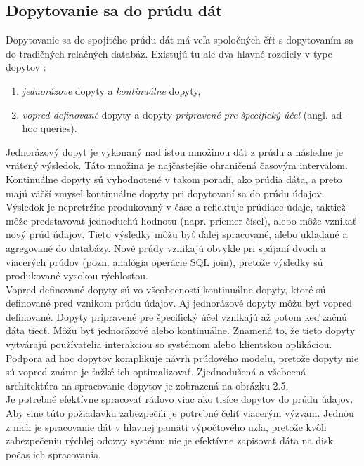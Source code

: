 \newpage
\subsection{Dopytovanie sa do prúdu dát}
Dopytovanie sa do spojitého prúdu dát má veľa spoločných čŕt s dopytovaním sa do tradičných relačných databáz. Existujú tu ale dva hlavné rozdiely v type dopytov \citep{terry1992continuous}: 
\begin{enumerate}
	\item \textit{jednorázove} dopyty a \textit{kontinuálne} dopyty,
	\item \textit{vopred definované} dopyty a dopyty \textit{pripravené pre špecifický účel} (angl. ad-hoc queries).
\end{enumerate}
Jednorázový dopyt je vykonaný nad istou množinou dát z prúdu a následne je vrátený výsledok. Táto množina je najčastejšie ohraničená časovým intervalom. Kontinuálne dopyty sú vyhodnotené v takom poradí, ako prúdia dáta, a preto majú väčší zmysel kontinuálne dopyty pri dopytovaní sa do prúdu údajov.  Výsledok je nepretržite produkovaný v čase a reflektuje prúdiace údaje, taktiež môže predstavovať jednoduchú hodnotu (napr. priemer čísel), alebo môže vznikať nový prúd údajov. Tieto výsledky môžu byť ďalej spracované, alebo ukladané a agregované do databázy. Nové prúdy vznikajú obvykle pri spájaní dvoch a viacerých prúdov (pozn. analógia operácie SQL join), pretože výsledky sú produkované vysokou rýchlosťou. 
\\[5pt]
Vopred definované dopyty sú vo všeobecnosti kontinuálne dopyty, ktoré sú definované pred vznikom prúdu údajov. Aj jednorázové dopyty môžu byť vopred definované. Dopyty pripravené pre špecifický účel vznikajú až potom keď začnú dáta tiecť. Môžu byť jednorázové alebo kontinuálne. Znamená to, že tieto dopyty vytvárajú používatelia interakciou so systémom alebo klientskou aplikáciou. Podpora ad hoc dopytov komplikuje návrh prúdového modelu, pretože dopyty nie sú vopred známe je ťažké ich optimalizovať. Zjednodušená a všebecná architektúra na spracovanie dopytov je zobrazená na obrázku 2.5. 
\\[5pt]
Je potrebné efektívne spracovať rádovo viac ako tisíce dopytov do prúdu údajov. Aby sme túto požiadavku zabezpečili je potrebné čeliť viacerým výzvam. Jednou z nich je spracovanie dát v hlavnej pamäti výpočtového uzla, pretože kvôli zabezpečeniu rýchlej odozvy systému nie je efektívne zapisovať dáta na disk počas ich spracovania. 

